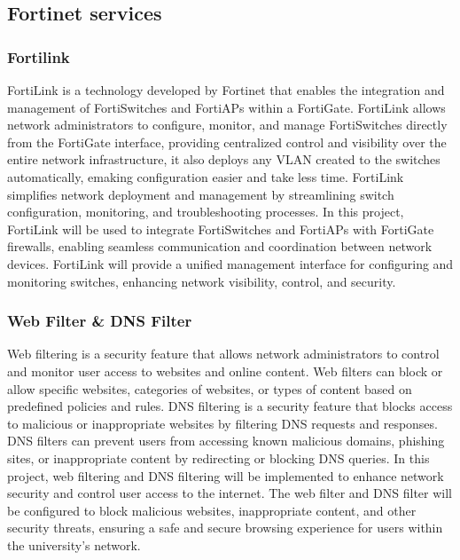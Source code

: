 \documentclass[12pt]{report}
\begin{document}
\subsection{Fortinet services}
\subsubsection{Fortilink}
FortiLink is a technology developed by Fortinet that enables the integration and management of FortiSwitches and FortiAPs within a FortiGate. FortiLink allows network administrators to configure, monitor, and manage FortiSwitches directly from the FortiGate interface, providing centralized control and visibility over the entire network infrastructure, it also deploys any VLAN created to the switches automatically, emaking configuration easier and take less time. FortiLink simplifies network deployment and management by streamlining switch configuration, monitoring, and troubleshooting processes. In this project, FortiLink will be used to integrate FortiSwitches and FortiAPs with FortiGate firewalls, enabling seamless communication and coordination between network devices. FortiLink will provide a unified management interface for configuring and monitoring switches, enhancing network visibility, control, and security. \cite{Fortilink}
\subsubsection{Web Filter \& DNS Filter}
Web filtering is a security feature that allows network administrators to control and monitor user access to websites and online content. Web filters can block or allow specific websites, categories of websites, or types of content based on predefined policies and rules. DNS filtering is a security feature that blocks access to malicious or inappropriate websites by filtering DNS requests and responses. DNS filters can prevent users from accessing known malicious domains, phishing sites, or inappropriate content by redirecting or blocking DNS queries. In this project, web filtering and DNS filtering will be implemented to enhance network security and control user access to the internet. The web filter and DNS filter will be configured to block malicious websites, inappropriate content, and other security threats, ensuring a safe and secure browsing experience for users within the university's network.
\cite{webfilter}  \cite{DNSfilter}
\end{document}
